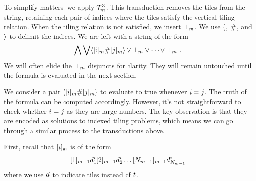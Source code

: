 To simplify matters, we apply $\psst^3_\expheight$. This transduction removes
the tiles from the string, retaining each pair of indices where the tiles
satisfy the vertical tiling relation. When the tiling relation is not
satisfied, we insert $\sffalse{\expheight}$. We use $\lmark$, $\spacer$, and
$\rmark$ to delimit the indices. We are left with a string of the form
\[
    \bigwedge \bigvee \lmark
        \tenc{\expheight}{\idxi} \spacer \tenc{\expheight}{\idxj}
    \rmark
    \lor \sffalse{\expheight} \lor \cdots \lor \sffalse{\expheight} \ .
\]
We will often elide the $\sffalse{\expheight}$ disjuncts for clarity. They
will remain untouched until the formula is evaluated in the next section.

We consider a pair $\lmark \tenc{\expheight}{\idxi} \spacer
\tenc{\expheight}{\idxj} \rmark$ to evaluate to true whenever $\idxi = \idxj$.
The truth of the formula can be computed accordingly. However, it's not
straightforward to check whether $\idxi = \idxj$ as they are large numbers. The
key observation is that they are encoded as solutions to indexed tiling
problems, which means we can go through a similar process to the transductions
above.

First, recall that $\tenc{\expheight}{\idxi}$ is of the form
\[
    \tenc{\expheight-1}{1} \vartile^\idxi_1
    \tenc{\expheight-1}{2} \vartile^\idxi_2
    \ldots
    \tenc{\expheight-1}{\nmax{\expheight-1}}
        \vartile^\idxi_{\nmax{\expheight-1}}
\]
where we use $\vartile$ to indicate tiles instead of $\tile$.

